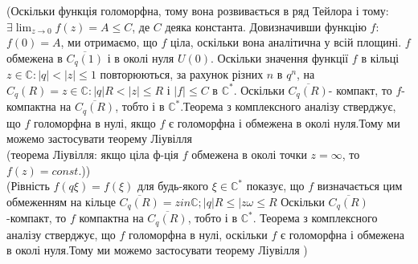\documentclass[12pt,a4paper]{article}
\begin{document}
(Оскільки функція голоморфна, тому вона розвивається в ряд Тейлора і тому: $\exists\lim_{z \to 0}f(z)=A\leq C$, де $C$ деяка константа. Довизначивши функцію $f$: $f(0)=A$, ми отримаємо, що $f$ ціла, оскільки вона аналітична у всій площині. $f$ обмежена в $\overline{C_{q}(1)}$ і в околі нуля $U(0)$. Оскільки значення функції $f$ в кільці ${z\in \mathbb{C}: \vert q \vert<\vert z \vert \leq 1}$ повторюються, за рахунок різних $n$ в $q^{n}$, на $C_{q}(R)={z\in \mathbb{C}: \vert q \vert R < \vert z \vert \leq R}$   і $\vert f \vert \leq C$ в $\mathbb{C}^{*}$. Оскільки $\overline{C_{q}(R)}$- компакт, то $f$- компактна на $\overline{C_{q}(R)}$, тобто і в $\mathbb{C}^{*}$.Теорема з комплексного аналізу стверджує, що $f$ голоморфна в нулі, якщо $f$ є голоморфна і обмежена в околі нуля.Тому ми можемо застосувати теорему Ліувілля \\
(теорема Ліувілля: якщо ціла ф-ція  $f$ обмежена в околі точки $ z=\infty $, то $f(z)=const$.))\\

(Рівність $f(q\xi)=f(\xi)$ для будь-якого $\xi \in \mathbb{C}^{*}$ показує, що $f$ визначається цим обмеженням на кільце $\overline{C_{q}(R)}={z in \mathbb{C}; \vert q \vert R\leq\vert z \omega\leq R }$ Оскільки $\overline{C_{q}(R)}$-компакт, то $f$ компактна на $\overline{C_{q}(R)}$, тобто і в $\mathbb{C}^{*}$. Теорема з комплексного аналізу стверджує, що $f$ голоморфна в нулі, оскільки $f$ є голоморфна і обмежена в околі нуля.Тому ми можемо застосувати теорему Ліувілля )
\[\begin{array}{l}
\end{array} \]
  
\end{document}
